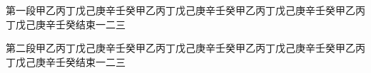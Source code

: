 \documentclass{article}
\newcommand{\zz}[1]{\par{\hangindent5mm\hangafter=1\setlength{\parindent}{5mm}\noindent#1\par}}
\begin{document}
\zz{第一段甲乙丙丁戊己庚辛壬癸甲乙丙丁戊己庚辛壬癸甲乙丙丁戊己庚辛壬癸甲乙丙丁戊己庚辛壬癸结束一二三

第二段甲乙丙丁戊己庚辛壬癸甲乙丙丁戊己庚辛壬癸甲乙丙丁戊己庚辛壬癸甲乙丙丁戊己庚辛壬癸结束一二三}
\end{document}
